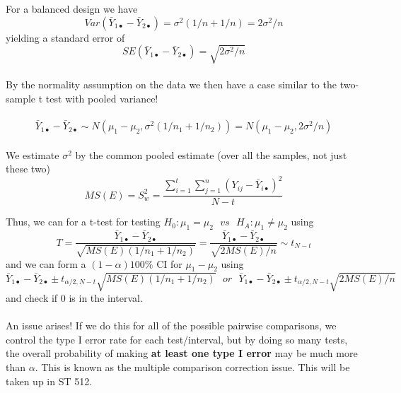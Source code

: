 For a balanced design we have
$$Var(\bar{Y}_{1\bullet}-\bar{Y}_{2\bullet}) = \sigma^2(1/n+1/n) = 2\sigma^2/n$$
yielding a standard error of
$$SE(\bar{Y}_{1\bullet}-\bar{Y}_{2\bullet})=\sqrt{2\sigma^2/n}$$~\\

By the normality assumption on the data we then have a case similar to the two-sample t test with pooled variance!\\~\\
$$\bar{Y}_{1\bullet}-\bar{Y}_{2\bullet}\sim N(\mu_1-\mu_2,\sigma^2(1/n_1+1/n_2)) = N(\mu_1-\mu_2,2\sigma^2/n) $$~\\

We estimate $\sigma^2$ by the common pooled estimate (over all the samples, not just these two)
$$MS(E)=S^2_w=\frac{\sum_{i=1}^{t}\sum_{j=1}^{n}(Y_{ij}-\bar{Y}_{i\bullet})^2}{N-t}$$

\newpage


Thus, we can for a t-test for testing $H_0:\mu_1=\mu_2~~~vs~~~H_A:\mu_1\neq\mu_2$ using
$$T=\frac{\bar{Y}_{1\bullet}-\bar{Y}_{2\bullet}}{\sqrt{MS(E)(1/n_1+1/n_2)}}=\frac{\bar{Y}_{1\bullet}-\bar{Y}_{2\bullet}}{\sqrt{2MS(E)/n}}\sim t_{N-t}$$
and we can form a $(1-\alpha)100\%$ CI for $\mu_1-\mu_2$ using
$$\bar{Y}_{1\bullet}-\bar{Y}_{2\bullet}\pm t_{\alpha/2,N-t}\sqrt{MS(E)(1/n_1+1/n_2)}~~~or~~~\bar{Y}_{1\bullet}-\bar{Y}_{2\bullet}\pm t_{\alpha/2,N-t}\sqrt{2MS(E)/n}$$
and check if 0 is in the interval.\\~\\

An issue arises!  If we do this for all of the possible pairwise comparisons, we control the type I error rate for each test/interval, but by doing so many tests, the overall probability of making \textbf{at least one type I error} may be much more than $\alpha$.  This is known as the multiple comparison correction issue.  This will be taken up in ST 512.\\

